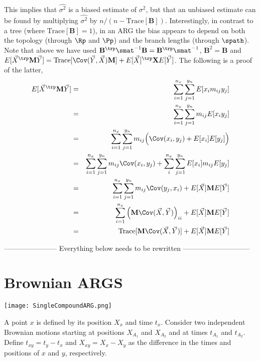 This implies that $\widehat{\sigma^2}$ is a biased estimate of $\sigma^2$, but that an unbiased estimate can be found by multiplying $\widehat{\sigma^2}$ by $n/(n-\text{Trace}[\mathbf{B}])$. Interestingly, in contrast to a tree (where $\text{Trace}[\mathbf{B}]=1$), in an ARG the bias appears to depend on both the topology (through $\Rp$ and $\Pp$) and the branch lengths (through $\spath$).
Note that above we have used $\mathbf{B}^\trp \smat^{-1} \mathbf{B} = \mathbf{B}^\trp\smat^{-1}$, $\mathbf{B}^2 = \mathbf{B}$ and $E[\vec{X}^\trp \mathbf{M} \vec{Y} ] = \text{Trace}[\Cov(\vec{Y},\vec{X})\mathbf{M}] + E[\vec{X}]^\trp\mathbf{X}E[\vec{Y}] $. The following is a proof of the latter,
\begin{eqnarray}
    E[\vec{X}^\trp \mathbf{M} \vec{Y} ] &=& \sum_{i=1}^{n_x} \sum_{j = 1}^{y_n} E[x_im_{ij}y_j] \\
    &=& \sum_{i=1}^{n_x} \sum_{j = 1}^{y_n} m_{ij}E[x_iy_j] \\
    &=& \sum_{i=1}^{n_x} \sum_{j = 1}^{y_n} m_{ij}\Big( \Cov(x_i,y_j) + E[x_i]E[y_j]\Big) \\
    &=& \sum_{i=1}^{n_x} \sum_{j = 1}^{y_n} m_{ij} \Cov(x_i,y_j) + \sum_{i}^{n_x} \sum_{j = 1}^{y_n} E[x_i]m_{ij}E[y_j] \\
    &=& \sum_{i=1}^{n_x} \sum_{j = 1}^{y_n} m_{ij} \Cov(y_j,x_i) + E[\vec{X}] \mathbf{M} E[\vec{Y }] \\
    &=& \sum_{i=1}^{n_x} \Big(\mathbf{M}\Cov(\vec{X},\vec{Y})\Big)_{ii}+ E[\vec{X}] \mathbf{M} E[\vec{Y }] \\
    &=& \text{Trace}[\mathbf{M}\Cov(\vec{X},\vec{Y})] + E[\vec{X}] \mathbf{M} E[\vec{Y }]
\end{eqnarray}

----------------------- Everything below needs to be rewritten -----------------------------
\section{Brownian ARGS} 

\begin{center}
\texttt{[image: SingleCompoundARG.png]} 
\end{center}
A point $x$ is defined by its position $X_x$ and time $t_x$. Consider two independent Brownian motions starting at positions $X_{A_1}$ and $X_{A_2}$ and at times $t_{A_1}$ and $t_{A_2}$. Define $t_{xy} = t_y - t_x$ and $X_{xy} = X_x - X_y$ as the difference in the times and positions of $x$ and $y$, respectively. 

